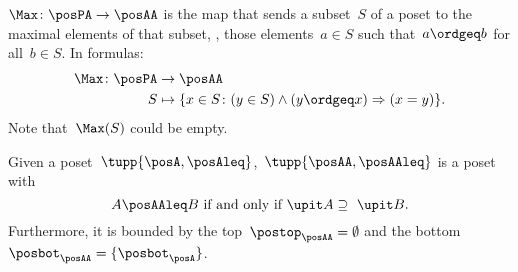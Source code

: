 \begin{definition}[Max]
  \label{def:Max}
  $\Max \colon \posPA \to \posAA$ is the map that sends a subset~$S$ of a poset to the maximal elements of that subset, \ie , those elements~$a \in S$ such that~$a \ordgeq b$ for all~$b \in S$. In formulas:
  \begin{equation*}
    \begin{aligned}
      \Max \colon \posPA &\to \posAA\\
      S&\mapsto \{ x\in S\colon (y\in S)\wedge(y\ordgeq x)\Rightarrow (x=y)\}.
    \end{aligned}
  \end{equation*}
  Note that~$\Max(S)$ could be empty.
\end{definition}


\begin{lemma}
  Given a poset~$\tupp{\posA,\posAleq}$,~$\tupp{\posAA,\posAAleq}$ is a poset with
  \begin{equation}
    \label{eq:orderantichain}
    A\posAAleq B \text{ if and only if } \upit  A \supseteq \ \upit  B.
  \end{equation}
  Furthermore, it is bounded by the top~$\postop_{\posAA}=\emptyset$ and the bottom~$\posbot_{\posAA}=\{\posbot_{\posA}\}$.
\end{lemma}

